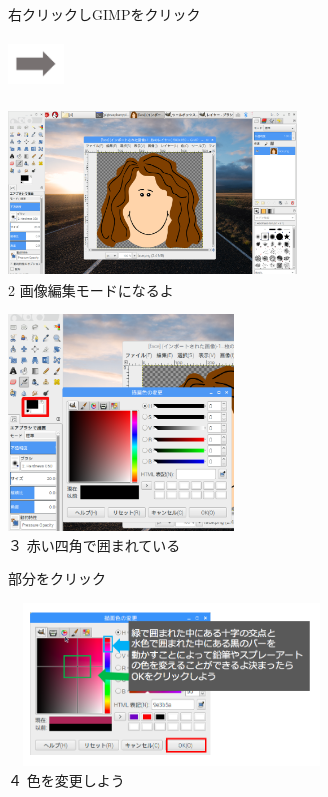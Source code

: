 \documentclass[a4paper,12pt]{jarticle}
\begin{document}
\begin{figure}[ht]
\begin{minipage}{\textwidth}
\begin{minipage}{5.852cm}
      右クリックしGIMPをクリック
    \end{minipage}
    \includegraphics[width=1.489cm,height=1.365cm]{textbook-img128.png}
    \begin{minipage}{7.975cm}
      \includegraphics[width=7.65cm,height=4.426cm]{textbook-img125.png}\\
      2 画像編集モードになるよ
    \end{minipage}


  \end{minipage}
  \bigskip




  \begin{minipage}{\textwidth}
    \begin{minipage}{5.984cm}
      \includegraphics[width=5.971cm,height=5.738cm]{textbook-img129.png}\\
      ３ 赤い四角で囲まれている

      部分をクリック


      \bigskip
    \end{minipage}
    \hfill
    \begin{minipage}{8.984cm}
      \includegraphics[width=8.654cm,height=4.325cm]{textbook-img126.png}\\
      ４ 色を変更しよう


\end{minipage}
\end{minipage}
\end{figure}
\end{document}

